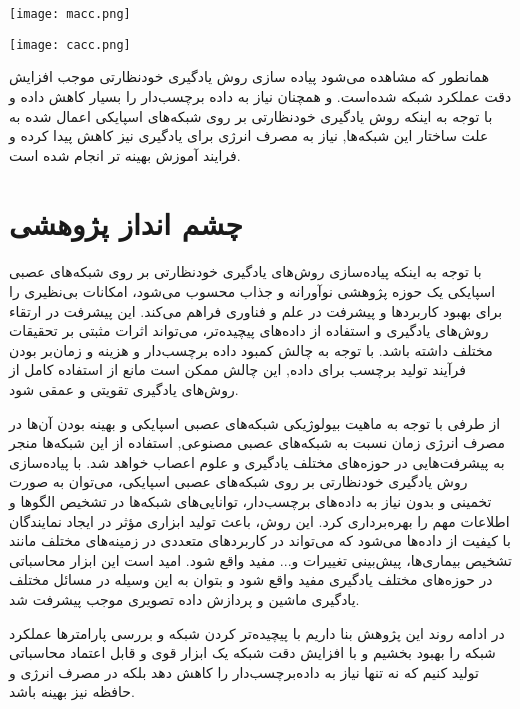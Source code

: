 \begin{minipage}{0.49\linewidth}
	\centering
	\texttt{[image: macc.png]}
	\captionsetup{font=small} %
	\label{fig:acc1}
\end{minipage}
\begin{minipage}{0.49\linewidth}
	\centering
	\texttt{[image: cacc.png]}
	\captionsetup{font=small} %
	\label{fig:acc2}
\end{minipage}

همانطور که مشاهده می‌شود پیاده سازی روش یادگیری خودنظارتی موجب افزایش دقت عملکرد شبکه شده‌است. و همچنان نیاز به داده برچسب‌دار را بسیار کاهش داده و با توجه به اینکه روش یادگیری خودنظارتی بر روی شبکه‌های اسپایکی اعمال شده به علت ساختار این شبکه‌ها, نیاز به مصرف انرژی برای یادگیری نیز کاهش پیدا کرده و فرایند آموزش بهینه ‌تر انجام شده است.




\section{چشم انداز پژوهشی}

 با توجه به اینکه پیاده‌سازی روش‌های یادگیری خودنظارتی بر روی شبکه‌های عصبی اسپایکی یک حوزه پژوهشی نوآورانه و جذاب محسوب می‌شود، امکانات بی‌نظیری را برای بهبود کاربردها و پیشرفت در علم و فناوری فراهم می‌کند. این پیشرفت در ارتقاء روش‌های یادگیری و استفاده از داده‌های پیچیده‌تر، می‌تواند اثرات مثبتی بر تحقیقات مختلف داشته باشد.
 با توجه به چالش کمبود داده برچسب‌دار و هزینه و زمان‌بر بودن فرآیند تولید برچسب برای داده, این چالش ممکن است مانع از استفاده کامل از روش‌های یادگیری تقویتی و عمقی شود. 
 
 از طرفی با توجه به ماهیت بیولوژیکی شبکه‌های عصبی اسپایکی و بهینه بودن آن‌ها در مصرف انرژی زمان نسبت به شبکه‌های عصبی مصنوعی, استفاده از این شبکه‌ها منجر به پیشرفت‌هایی در حوزه‌های مختلف یادگیری و علوم اعصاب خواهد شد.
 با پیاده‌سازی روش‌ یادگیری خودنظارتی بر روی شبکه‌های عصبی اسپایکی، می‌توان به صورت تخمینی و بدون نیاز به داده‌های برچسب‌دار، توانایی‌های شبکه‌ها در تشخیص الگوها و اطلاعات مهم را بهره‌برداری کرد. این روش، باعث تولید ابزاری مؤثر در ایجاد نمایندگان با کیفیت از داده‌ها می‌شود که می‌تواند در کاربردهای متعددی در زمینه‌های مختلف مانند تشخیص بیماری‌ها، پیش‌بینی تغییرات و... مفید واقع شود.
 امید است این ابزار محاسباتی در حوزه‌های مختلف یادگیری مفید واقع شود و بتوان به این وسیله در مسائل مختلف یادگیری ماشین و پردازش داده تصویری موجب پیشرفت شد.
 
 در ادامه روند این پژوهش بنا داریم با پیچیده‌تر کردن شبکه و بررسی پارامتر‌ها عملکرد شبکه را بهبود بخشیم و با افزایش دقت شبکه یک ابزار قوی و قابل اعتماد محاسباتی تولید کنیم که نه تنها نیاز به داده‌برچسب‌دار را کاهش دهد بلکه در مصرف انرژی و حافظه نیز بهینه باشد.
 